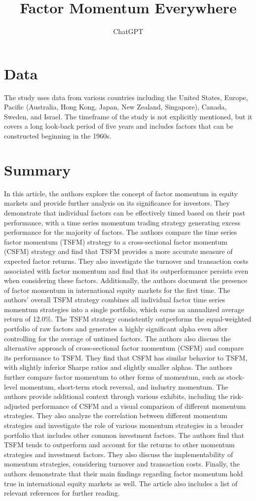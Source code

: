 \documentclass{article}
\title{Factor Momentum Everywhere}
\author{ChatGPT}
\begin{document}
 

\maketitle
\section{Data}
The study uses data from various countries including the United States, Europe, Pacific (Australia, Hong Kong, Japan, New Zealand, Singapore), Canada, Sweden, and Israel. The timeframe of the study is not explicitly mentioned, but it covers a long look-back period of five years and includes factors that can be constructed beginning in the 1960s. 
\section{Summary}
In this article, the authors explore the concept of factor momentum in equity markets and provide further analysis on its significance for investors. They demonstrate that individual factors can be effectively timed based on their past performance, with a time series momentum trading strategy generating excess performance for the majority of factors. The authors compare the time series factor momentum (TSFM) strategy to a cross-sectional factor momentum (CSFM) strategy and find that TSFM provides a more accurate measure of expected factor returns. They also investigate the turnover and transaction costs associated with factor momentum and find that its outperformance persists even when considering these factors. Additionally, the authors document the presence of factor momentum in international equity markets for the first time. The authors' overall TSFM strategy combines all individual factor time series momentum strategies into a single portfolio, which earns an annualized average return of 12.0\%. The TSFM strategy consistently outperforms the equal-weighted portfolio of raw factors and generates a highly significant alpha even after controlling for the average of untimed factors. The authors also discuss the alternative approach of cross-sectional factor momentum (CSFM) and compare its performance to TSFM. They find that CSFM has similar behavior to TSFM, with slightly inferior Sharpe ratios and slightly smaller alphas. The authors further compare factor momentum to other forms of momentum, such as stock-level momentum, short-term stock reversal, and industry momentum. The authors provide additional context through various exhibits, including the risk-adjusted performance of CSFM and a visual comparison of different momentum strategies. They also analyze the correlation between different momentum strategies and investigate the role of various momentum strategies in a broader portfolio that includes other common investment factors. The authors find that TSFM tends to outperform and account for the returns to other momentum strategies and investment factors. They also discuss the implementability of momentum strategies, considering turnover and transaction costs. Finally, the authors demonstrate that their main findings regarding factor momentum hold true in international equity markets as well. The article also includes a list of relevant references for further reading. 
\end{document}
